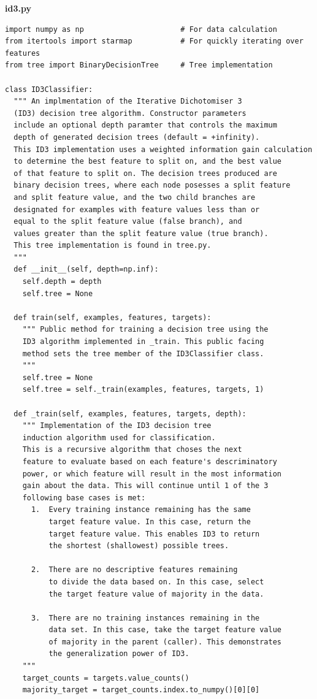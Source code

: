 \documentclass[a4paper]{article}
\begin{document}
\textbf{id3.py}
\begin{lstlisting}[basicstyle= \scriptsize]
import numpy as np                      # For data calculation
from itertools import starmap           # For quickly iterating over features
from tree import BinaryDecisionTree     # Tree implementation

class ID3Classifier:
  """ An implmentation of the Iterative Dichotomiser 3
  (ID3) decision tree algorithm. Constructor parameters
  include an optional depth paramter that controls the maximum
  depth of generated decision trees (default = +infinity).
  This ID3 implementation uses a weighted information gain calculation
  to determine the best feature to split on, and the best value
  of that feature to split on. The decision trees produced are 
  binary decision trees, where each node posesses a split feature
  and split feature value, and the two child branches are 
  designated for examples with feature values less than or
  equal to the split feature value (false branch), and
  values greater than the split feature value (true branch).
  This tree implementation is found in tree.py.
  """
  def __init__(self, depth=np.inf):
    self.depth = depth
    self.tree = None

  def train(self, examples, features, targets):
    """ Public method for training a decision tree using the 
    ID3 algorithm implemented in _train. This public facing
    method sets the tree member of the ID3Classifier class.
    """
    self.tree = None
    self.tree = self._train(examples, features, targets, 1) 

  def _train(self, examples, features, targets, depth):
    """ Implementation of the ID3 decision tree
    induction algorithm used for classification.
    This is a recursive algorithm that choses the next
    feature to evaluate based on each feature's descriminatory
    power, or which feature will result in the most information
    gain about the data. This will continue until 1 of the 3
    following base cases is met:
      1.  Every training instance remaining has the same
          target feature value. In this case, return the
          target feature value. This enables ID3 to return
          the shortest (shallowest) possible trees.

      2.  There are no descriptive features remaining
          to divide the data based on. In this case, select
          the target feature value of majority in the data.

      3.  There are no training instances remaining in the
          data set. In this case, take the target feature value
          of majority in the parent (caller). This demonstrates
          the generalization power of ID3.
    """
    target_counts = targets.value_counts()
    majority_target = target_counts.index.to_numpy()[0][0]


\end{lstlisting}
\end{document}
